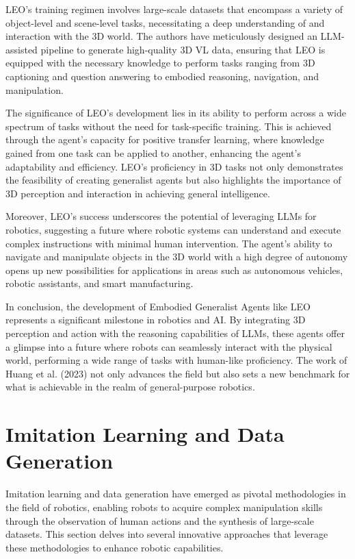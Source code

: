 \documentclass[a4paper]{article}
\begin{document}
LEO's training regimen involves large-scale datasets that encompass a variety of object-level and scene-level tasks, necessitating a deep understanding of and interaction with the 3D world. The authors have meticulously designed an LLM-assisted pipeline to generate high-quality 3D VL data, ensuring that LEO is equipped with the necessary knowledge to perform tasks ranging from 3D captioning and question answering to embodied reasoning, navigation, and manipulation.

The significance of LEO's development lies in its ability to perform across a wide spectrum of tasks without the need for task-specific training. This is achieved through the agent's capacity for positive transfer learning, where knowledge gained from one task can be applied to another, enhancing the agent's adaptability and efficiency. LEO's proficiency in 3D tasks not only demonstrates the feasibility of creating generalist agents but also highlights the importance of 3D perception and interaction in achieving general intelligence.

Moreover, LEO's success underscores the potential of leveraging LLMs for robotics, suggesting a future where robotic systems can understand and execute complex instructions with minimal human intervention. The agent's ability to navigate and manipulate objects in the 3D world with a high degree of autonomy opens up new possibilities for applications in areas such as autonomous vehicles, robotic assistants, and smart manufacturing.

In conclusion, the development of Embodied Generalist Agents like LEO represents a significant milestone in robotics and AI. By integrating 3D perception and action with the reasoning capabilities of LLMs, these agents offer a glimpse into a future where robots can seamlessly interact with the physical world, performing a wide range of tasks with human-like proficiency. The work of Huang et al. (2023) not only advances the field but also sets a new benchmark for what is achievable in the realm of general-purpose robotics.
\section{Imitation Learning and Data Generation}
Imitation learning and data generation have emerged as pivotal methodologies in the field of robotics, enabling robots to acquire complex manipulation skills through the observation of human actions and the synthesis of large-scale datasets. This section delves into several innovative approaches that leverage these methodologies to enhance robotic capabilities.
\end{document}
